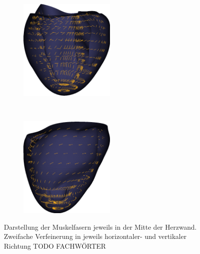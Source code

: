 \documentclass[
	a4paper,			%
	11pt,				%
	headsepline,		%
	bibtotoc,			%
	BCOR18mm,      		%
	DIV14,				%
	headings=normal,
	numbers=noenddot,
]{scrbook}
\theoremstyle{mythmstyle}
\theoremstyle{other}
\begin{document}
		\begin{figure}[h]
	
	\begin{subfigure}[t]{0.5\textwidth}
		\centering
		\includegraphics[height=5cm]{fibers_200_1.png}%
		\caption{}
	\end{subfigure}
	~
	\begin{subfigure}[t]{0.5\textwidth}
		\centering
		\includegraphics[height=5cm]{fibers_200_2.png}%
		\caption{}
	\end{subfigure}
	
	
	\caption{Darstellung der Muskelfasern jeweils in der Mitte der Herzwand. Zweifache Verfeinerung
	in jeweils horizontaler- und vertikaler Richtung TODO FACHWÖRTER}
		
	\label{figure:fibers_200}
	\end{figure}
\end{document}
